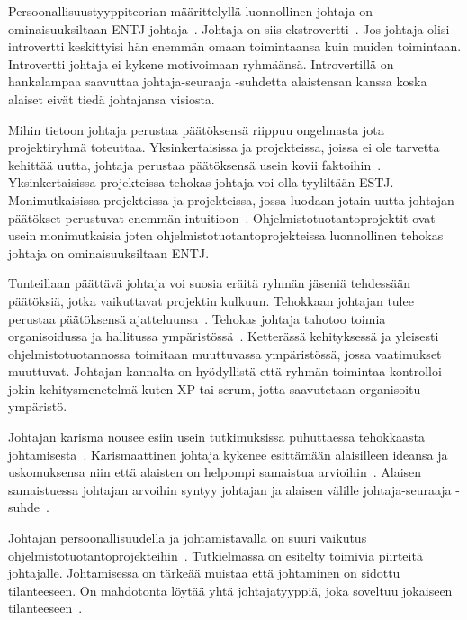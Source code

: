 \documentclass[finnish]{tktltiki2}
\theoremstyle{definition}
\theoremstyle{remark}
\begin{document}
Persoonallisuustyyppiteorian määrittelyllä luonnollinen johtaja on ominaisuuksiltaan ENTJ-johtaja~\cite{bradley1997effect}. Johtaja on siis ekstrovertti~\cite{bradley1997effect}. Jos johtaja olisi introvertti keskittyisi hän enemmän omaan toimintaansa kuin muiden toimintaan. Introvertti johtaja ei kykene motivoimaan ryhmäänsä. Introvertillä on hankalampaa saavuttaa johtaja-seuraaja -suhdetta alaistensan kanssa koska alaiset eivät tiedä johtajansa visiosta.

Mihin tietoon johtaja perustaa päätöksensä riippuu ongelmasta jota projektiryhmä toteuttaa. Yksinkertaisissa ja projekteissa, joissa ei ole tarvetta kehittää uutta, johtaja perustaa päätöksensä usein kovii faktoihin~\cite{bradley1997effect}. Yksinkertaisissa projekteissa tehokas johtaja voi olla tyyliltään ESTJ. Monimutkaisissa projekteissa ja projekteissa, jossa luodaan jotain uutta johtajan päätökset perustuvat enemmän intuitioon~\cite{bradley1997effect}. Ohjelmistotuotantoprojektit ovat usein monimutkaisia joten ohjelmistotuotantoprojekteissa luonnollinen tehokas johtaja on ominaisuuksiltaan ENTJ.

Tunteillaan päättävä johtaja voi suosia eräitä ryhmän jäseniä tehdessään päätöksiä, jotka vaikuttavat projektin kulkuun. Tehokkaan johtajan tulee perustaa päätöksensä ajatteluunsa~\cite{bradley1997effect}. Tehokas johtaja tahotoo toimia organisoidussa ja hallitussa ympäristössä~\cite{bradley1997effect}. Ketterässä kehityksessä ja yleisesti ohjelmistotuotannossa toimitaan muuttuvassa ympäristössä, jossa vaatimukset muuttuvat. Johtajan kannalta on hyödyllistä että ryhmän toimintaa kontrolloi jokin kehitysmenetelmä kuten XP tai scrum, jotta saavutetaan organisoitu ympäristö.

Johtajan karisma nousee esiin usein tutkimuksissa puhuttaessa tehokkaasta johtamisesta~\cite{Dhomne:2012:ITL:2382887.2382899, thite2000leadership}. Karismaattinen johtaja kykenee esittämään alaisilleen ideansa ja uskomuksensa niin että alaisten on helpompi samaistua arvioihin~\cite{thite2000leadership}. Alaisen samaistuessa johtajan arvoihin syntyy johtajan ja alaisen välille johtaja-seuraaja -suhde~\cite{raccoon2006leadership}.

Johtajan persoonallisuudella ja johtamistavalla on suuri vaikutus ohjelmistotuotantoprojekteihin~\cite{Wang:2009:PMP:1639950.1640049}. Tutkielmassa on esitelty toimivia piirteitä johtajalle. Johtamisessa on tärkeää muistaa että johtaminen on sidottu tilanteeseen. On mahdotonta löytää yhtä johtajatyyppiä, joka soveltuu jokaiseen tilanteeseen~\cite{thite2000leadership}.
\end{document}

